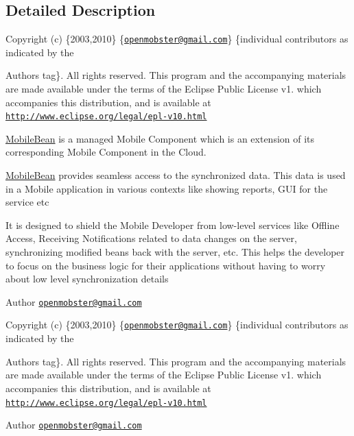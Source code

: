 \subsection{\-Detailed \-Description}
\-Copyright (c) \{2003,2010\} \{\href{mailto:openmobster@gmail.com}{\tt openmobster@gmail.\-com}\} \{individual contributors as indicated by the \begin{DoxyAuthor}{\-Authors}
tag\}. \-All rights reserved. \-This program and the accompanying materials are made available under the terms of the \-Eclipse \-Public \-License v1. which accompanies this distribution, and is available at \href{http://www.eclipse.org/legal/epl-v10.html}{\tt http\-://www.\-eclipse.\-org/legal/epl-\/v10.\-html}
\end{DoxyAuthor}
\hyperlink{interface_mobile_bean}{\-Mobile\-Bean} is a managed \-Mobile \-Component which is an extension of its corresponding \-Mobile \-Component in the \-Cloud.

\hyperlink{interface_mobile_bean}{\-Mobile\-Bean} provides seamless access to the synchronized data. \-This data is used in a \-Mobile application in various contexts like showing reports, \-G\-U\-I for the service etc

\-It is designed to shield the \-Mobile \-Developer from low-\/level services like \-Offline \-Access, \-Receiving \-Notifications related to data changes on the server, synchronizing modified beans back with the server, etc. \-This helps the developer to focus on the business logic for their applications without having to worry about low level synchronization details

\begin{DoxyAuthor}{\-Author}
\href{mailto:openmobster@gmail.com}{\tt openmobster@gmail.\-com}
\end{DoxyAuthor}
\-Copyright (c) \{2003,2010\} \{\href{mailto:openmobster@gmail.com}{\tt openmobster@gmail.\-com}\} \{individual contributors as indicated by the \begin{DoxyAuthor}{\-Authors}
tag\}. \-All rights reserved. \-This program and the accompanying materials are made available under the terms of the \-Eclipse \-Public \-License v1. which accompanies this distribution, and is available at \href{http://www.eclipse.org/legal/epl-v10.html}{\tt http\-://www.\-eclipse.\-org/legal/epl-\/v10.\-html}
\end{DoxyAuthor}
\begin{DoxyAuthor}{\-Author}
\href{mailto:openmobster@gmail.com}{\tt openmobster@gmail.\-com} 
\end{DoxyAuthor}


